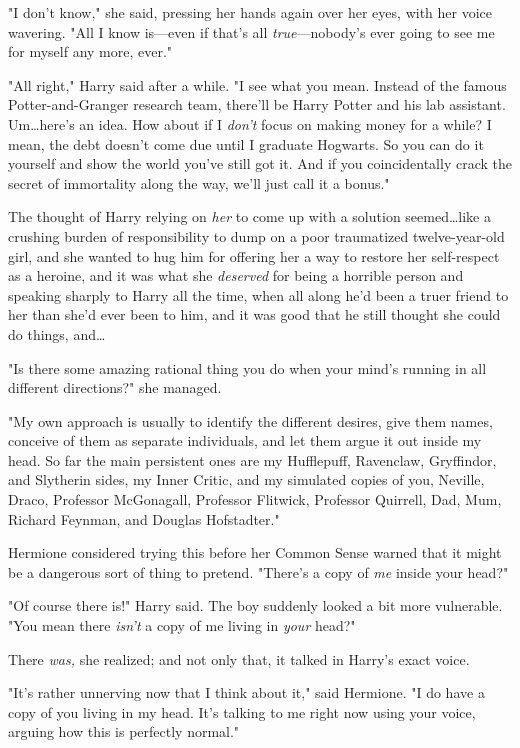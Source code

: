 "I don’t know," she said, pressing her hands again over her eyes, with her
voice wavering. "All I know is—even if that’s all \emph{true}—nobody’s ever
going to see me for myself any more, ever."

"All right," Harry said after a while. "I see what you mean. Instead of the
famous Potter-and-Granger research team, there’ll be Harry Potter and his lab
assistant. Um…here’s an idea. How about if I \emph{don’t} focus on
making money for a while? I mean, the debt doesn’t come due until I graduate
Hogwarts. So you can do it yourself and show the world you’ve still got it. And
if you coincidentally crack the secret of immortality along the way, we’ll just
call it a bonus."

The thought of Harry relying on \emph{her} to come up with a solution
seemed…like a crushing burden of responsibility to dump on a poor
traumatized twelve-year-old girl, and she wanted to hug him for offering her a
way to restore her self-respect as a heroine, and it was what she
\emph{deserved} for being a horrible person and speaking sharply to Harry all
the time, when all along he’d been a truer friend to her than she’d ever been
to him, and it was good that he still thought she could do things, and…

"Is there some amazing rational thing you do when your mind’s running in all
different directions?" she managed.

"My own approach is usually to identify the different desires, give them names,
conceive of them as separate individuals, and let them argue it out inside my
head. So far the main persistent ones are my Hufflepuff, Ravenclaw, Gryffindor,
and Slytherin sides, my Inner Critic, and my simulated copies of you, Neville,
Draco, Professor McGonagall, Professor Flitwick, Professor Quirrell, Dad, Mum,
Richard Feynman, and Douglas Hofstadter."

Hermione considered trying this before her Common Sense warned that it might be
a dangerous sort of thing to pretend. "There’s a copy of \emph{me} inside your
head?"

"Of course there is!" Harry said. The boy suddenly looked a bit more
vulnerable. "You mean there \emph{isn’t} a copy of me living in \emph{your}
head?"

There \emph{was,} she realized; and not only that, it talked in Harry’s exact
voice.

"It’s rather unnerving now that I think about it," said Hermione. "I do have a
copy of you living in my head. It’s talking to me right now using your voice,
arguing how this is perfectly normal."

